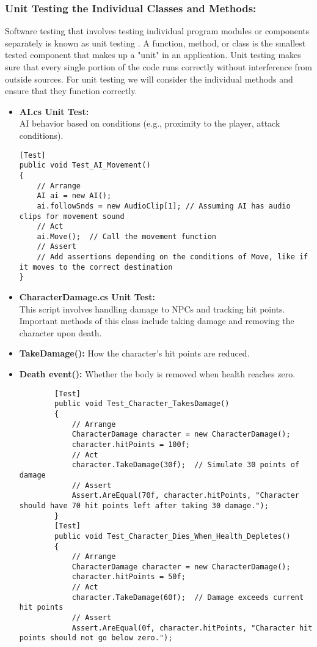 \subsubsection{Unit Testing the Individual Classes and Methods:} 
Software testing that involves testing individual program modules or components separately is known as unit testing \cite{fowler_unit_test}. A function, method, or class is the smallest tested component that makes up a "unit" in an application. Unit testing makes sure that every single portion of the code runs correctly without interference from outside sources. For unit testing we will consider the individual methods and ensure that they function correctly.
\begin{itemize}
	\item  \textbf{AI.cs Unit Test:}
	\\
	AI behavior based on conditions (e.g., proximity to the player, attack conditions).
	\begin{lstlisting}
[Test]
public void Test_AI_Movement()
{
	// Arrange
	AI ai = new AI();
	ai.followSnds = new AudioClip[1]; // Assuming AI has audio clips for movement sound
	// Act
	ai.Move();  // Call the movement function
	// Assert
	// Add assertions depending on the conditions of Move, like if it moves to the correct destination
}
	\end{lstlisting}
	\item  \textbf{CharacterDamage.cs Unit Test:}
	\\
	This script involves handling damage to NPCs and tracking hit points. Important methods of this class include taking damage and removing the character upon death.
	\item \textbf{TakeDamage():} How the character's hit points are reduced.
	\item \textbf{Death event():} Whether the body is removed when health reaches zero.
	\begin{lstlisting}
		[Test]
		public void Test_Character_TakesDamage()
		{
			// Arrange
			CharacterDamage character = new CharacterDamage();
			character.hitPoints = 100f;
			// Act
			character.TakeDamage(30f);  // Simulate 30 points of damage
			// Assert
			Assert.AreEqual(70f, character.hitPoints, "Character should have 70 hit points left after taking 30 damage.");
		}
		[Test]
		public void Test_Character_Dies_When_Health_Depletes()
		{
			// Arrange
			CharacterDamage character = new CharacterDamage();
			character.hitPoints = 50f;
			// Act
			character.TakeDamage(60f);  // Damage exceeds current hit points
			// Assert
			Assert.AreEqual(0f, character.hitPoints, "Character hit points should not go below zero.");

\end{lstlisting}
\end{itemize}
